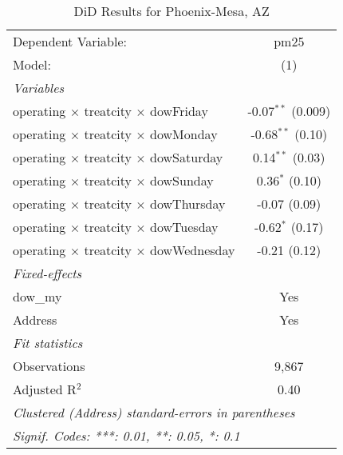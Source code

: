 
\begin{table}[htbp]
   \caption{DiD Results for Phoenix-Mesa, AZ}
   \centering
   \begin{tabular}{lc}
      \tabularnewline \midrule \midrule
      Dependent Variable:                                  & pm25\\  
      Model:                                               & (1)\\  
      \midrule
      \emph{Variables}\\
      operating $\times$ treatcity $\times$ dowFriday      & -0.07$^{**}$ (0.009)\\   
      operating $\times$ treatcity $\times$ dowMonday      & -0.68$^{**}$ (0.10)\\   
      operating $\times$ treatcity $\times$ dowSaturday    & 0.14$^{**}$ (0.03)\\   
      operating $\times$ treatcity $\times$ dowSunday      & 0.36$^{*}$ (0.10)\\   
      operating $\times$ treatcity $\times$ dowThursday    & -0.07 (0.09)\\   
      operating $\times$ treatcity $\times$ dowTuesday     & -0.62$^{*}$ (0.17)\\   
      operating $\times$ treatcity $\times$ dowWednesday   & -0.21 (0.12)\\   
      \midrule
      \emph{Fixed-effects}\\
      dow\_my                                              & Yes\\  
      Address                                              & Yes\\  
      \midrule
      \emph{Fit statistics}\\
      Observations                                         & 9,867\\  
      Adjusted R$^2$                                       & 0.40\\  
      \midrule \midrule
      \multicolumn{2}{l}{\emph{Clustered (Address) standard-errors in parentheses}}\\
      \multicolumn{2}{l}{\emph{Signif. Codes: ***: 0.01, **: 0.05, *: 0.1}}\\
   \end{tabular}
\end{table}


